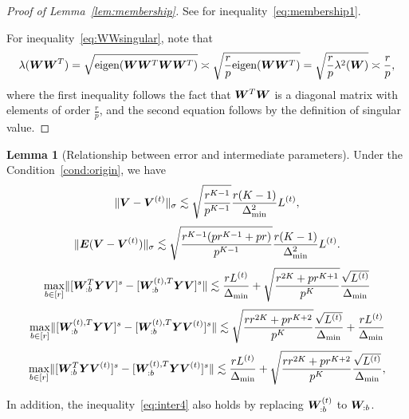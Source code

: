 \documentclass[lettersize,journal]{IEEEtran}
\theoremstyle{definition}
\newtheorem{lem}{Lemma}
\theoremstyle{definition}
\begin{document}
\begin{proof}[Proof of Lemma~\ref{lem:membership}] See \citet[Proof of Lemma 4]{han2020exact} for inequality~\eqref{eq:membership1}.

For inequality~\eqref{eq:WWsingular}, note that 
\begin{align}
    \lambda(\bm{W}\bm{W}^T) = \sqrt{\text{eigen} (\bm{W} \bm{W}^T\bm{W}\bm{W}^T)} \asymp \sqrt{\frac{r}{p} \text{eigen} (\bm{W} \bm{W}^T)} = \sqrt{\frac{r}{p} \lambda^2(\bm{W})} \asymp \frac{r}{p},
\end{align}
where the first inequality follows the fact that $\bm{W}^T\bm{W}$ is a diagonal matrix with elements of order $\frac{r}{p}$, and the second equation follows by the definition of singular value.
\end{proof}


     \begin{lem}[Relationship between error and intermediate parameters]\label{lem:intermediate} Under the Condition~\ref{cond:origin}, we have
    \begin{equation}\label{eq:inter1}
        \onormSize{}{\mV - \mV^{(t)}}_{\sigma} \lesssim \sqrt{\frac{r^{K-1}}{p^{K-1}}}  \frac{r(K-1)}{\Delta_{\min}^2} L^{(t)},
    \end{equation}
    \begin{equation}\label{eq:inter2}
        \onormSize{}{\mE (\mV - \mV^{(t)})}_{\sigma} \lesssim \sqrt{ \frac{r^{K-1}(p r^{K-1} + p r)}{p^{K-1}}} 
 \frac{r(K-1)}{\Delta_{\min}^2} L^{(t)}.    
 \end{equation}
 \begin{equation}\label{eq:inter3}
     \max_{b \in [r]} \onormSize{}{ [ \mW_{:b}^T \mY \mV ]^s   -  [ \mW_{:b}^{(t), T} \mY \mV  ]^s } \lesssim \frac{r L^{(t)}}{\Delta_{\min}} + \sqrt{ \frac{r^{2K} + pr^{K+1}}{p^{K}} } \frac{\sqrt{L^{(t)}}}{\Delta_{\min}}
 \end{equation}
 \begin{equation}\label{eq:inter4}
     \max_{b \in [r]} \onormSize{}{  [  \mW_{:b}^{(t), T}  \mY \mV]^s - [  \mW_{:b}^{(t), T}  \mY \mV^{(t)}]^s } \lesssim  \sqrt{ \frac{rr^{2K} + p r^{K+2}}{p^{K}}}  \frac{\sqrt{L^{(t)}}}{\Delta_{\min}} +  \frac{r L^{(t)}}{\Delta_{\min}}
     \end{equation}
    \begin{equation}\label{eq:inter5}
         \max_{b \in [r]} \onormSize{}{ [\mW_{:b}^T \mY \mV^{(t)} ]^s   -  [ \mW_{:b}^{(t), T} \mY \mV^{(t)} ]^s } \lesssim \frac{rL^{(t)}}{\Delta_{\min}} + \sqrt{ \frac{rr^{2K} + p r^{K+2}}{p^{K}}}  \frac{\sqrt{L^{(t)}}}{\Delta_{\min}},
    \end{equation}
    
    In addition, the inequality~\eqref{eq:inter4} also holds by replacing $\bm{W}_{:b}^{(t)}$ to $\bm{W}_{:b}$.
    \end{lem}
        
\end{document}
